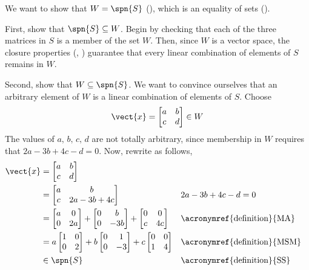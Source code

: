 We want to show that $W=\spn{S}$ (), which is an equality of sets ().\par
%
First, show that $\spn{S}\subseteq W$.  Begin by checking that each of the three matrices in $S$ is a member of the set $W$.  Then, since $W$ is a vector space, the closure properties (, ) guarantee that every linear combination of elements of $S$ remains in $W$.\par
%
Second, show that $W\subseteq\spn{S}$.    We want to convince ourselves that an arbitrary element of $W$ is a linear combination of elements of $S$.  Choose 
%
\begin{equation*}
\vect{x}=\begin{bmatrix}a&b\\c&d\end{bmatrix}\in W
\end{equation*}
%
The values of $a,\,b,\,c,\,d$ are not totally arbitrary, since membership in $W$ requires that 
$2a-3b+4c-d=0$.  Now, rewrite as follows,
%
\begin{align*}
\vect{x}
&=\begin{bmatrix}a&b\\c&d\end{bmatrix}\\
%
&=\begin{bmatrix}a&b\\c&2a-3b+4c\end{bmatrix}
&&2a-3b+4c-d=0\\
%
&=
\begin{bmatrix}a&0\\0&2a\end{bmatrix}+
\begin{bmatrix}0&b\\0&-3b\end{bmatrix}+
\begin{bmatrix}0&0\\c&4c\end{bmatrix}
&&\text{\acronymref{definition}{MA}}\\
%
&=
a\begin{bmatrix}1&0\\0&2\end{bmatrix}+
b\begin{bmatrix}0&1\\0&-3\end{bmatrix}+
c\begin{bmatrix}0&0\\1&4\end{bmatrix}
&&\text{\acronymref{definition}{MSM}}\\
%
&\in\spn{S}
&&\text{\acronymref{definition}{SS}}
%
\end{align*}
